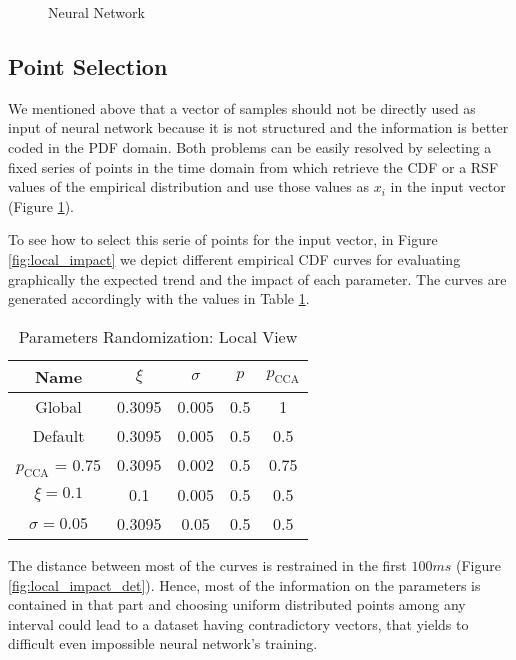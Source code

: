 \begin{figure}[!htbp]
	\begin{center}
		
	\end{center}
	\caption{Neural Network}
	\label{fig:neural_network}
\end{figure}

\subsection{Point Selection} \label{sec:nn_point_selection}

We mentioned above that a vector of samples should not be directly used as input of neural network because it is not structured and the information is better coded in the \ac{PDF} domain. Both problems can be easily resolved by selecting a fixed series of points in the time domain from which retrieve the \ac{CDF} or a \ac{RSF} values of the empirical distribution and use those values as $x_i$ in the input vector (Figure \ref{fig:neural_network}).

To see how to select this serie of points for the input vector, in Figure \ref{fig:local_impact} we depict different empirical \ac{CDF} curves for evaluating graphically the expected trend and the impact of each parameter. The curves are generated accordingly with the values in Table \ref{tab:local_cdf}.

\begin{table}[!htbp]
	\begin{center}
		\begin{tabular}{ c | c c c c }
			Name & $\xi$ & $\sigma$ & $p$ & $p_{\text{CCA}}$ \\
			\hline
			Global & 0.3095 & 0.005 & 0.5 & 1 \\
			Default & 0.3095 & 0.005 & 0.5 & 0.5 \\
			$p_{\text{CCA}}$ = 0.75 & 0.3095 & 0.002 & 0.5 & 0.75 \\
			$\xi = 0.1$ & 0.1 & 0.005 & 0.5 & 0.5 \\
			$\sigma = 0.05$ & 0.3095 & 0.05 & 0.5 & 0.5 \\
		\end{tabular}
		\caption{Parameters Randomization: Local View}
		\label{tab:local_cdf}
	\end{center}
\end{table}

The distance between most of the curves is restrained in the first $100 ms$ (Figure \ref{fig:local_impact_det}). Hence, most of the information on the parameters is contained in that part and choosing uniform distributed points among any interval could lead to a dataset having contradictory vectors, that yields to difficult even impossible neural network's training.

